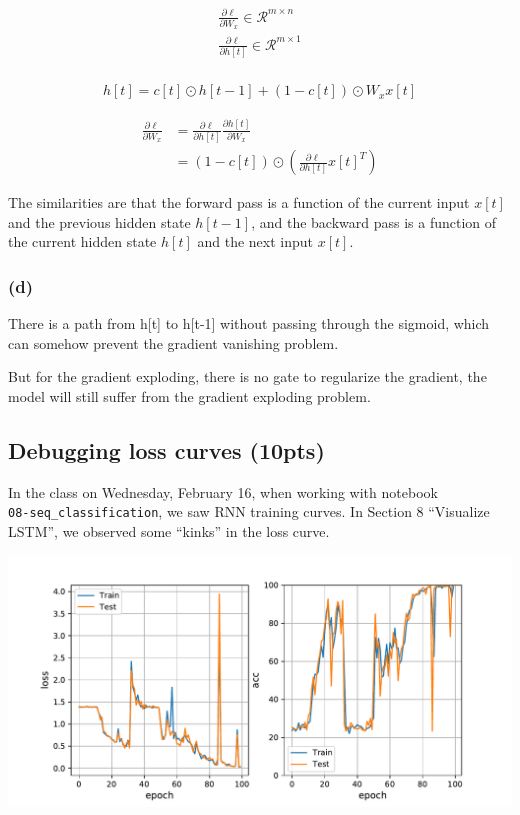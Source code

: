 \begin{align}
    \frac{\partial \ell}{\partial W_x} \in \mathcal{R}^{m \times n} \\
    \frac{\partial \ell}{\partial h[t]} \in \mathcal{R}^{m \times 1} \\
\end{align}

\begin{align}
    h[t] = c[t] \odot h[{t-1}] + (1-c[t]) \odot W_x x[t]
\end{align}

\begin{align}
    \frac{\partial \ell}{\partial W_x} &= \frac{\partial \ell}{\partial h[t]}  \frac{\partial h[t]}{\partial W_x} \\
    &= (1-c[t]) \odot (\frac{\partial \ell}{\partial h[t]} x[t]^T)
\end{align}

The similarities are that the forward pass is a function of the current input $x[t]$ and the previous hidden state $h[t-1]$, and the backward pass is a function of the current hidden state $h[t]$ and the next input $x[t]$.

\subsubsection*{(d)}

There is a path from h[t] to h[t-1] without passing through the sigmoid, which can somehow prevent the gradient vanishing problem.

But for the gradient exploding, there is no gate to regularize the gradient, the model will still suffer from the gradient exploding problem.


\subsection{Debugging loss curves (10pts)}
\label{debug_loss}

In the class on Wednesday, February 16, when working with notebook \\
\texttt{08-seq\_classification}, we saw RNN training curves. In Section 8 ``Visualize LSTM'', we observed some ``kinks'' in the loss curve.

\begin{center}
\includegraphics[scale=0.5]{plots.pdf}
\end{center}

